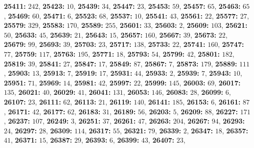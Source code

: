 \textsf{\bfseries 25411:} $242$, \textsf{\bfseries 25423:} $10$, \textsf{\bfseries 25439:} $34$, \textsf{\bfseries 25447:} $23$, \textsf{\bfseries 25453:} $59$, \textsf{\bfseries 25457:} $65$, \textsf{\bfseries 25463:} $65$, \textsf{\bfseries 25469:} $60$, \textsf{\bfseries 25471:} $6$, \textsf{\bfseries 25523:} $68$, \textsf{\bfseries 25537:} $10$, \textsf{\bfseries 25541:} $43$, \textsf{\bfseries 25561:} $22$, \textsf{\bfseries 25577:} $27$, \textsf{\bfseries 25579:} $329$, \textsf{\bfseries 25583:} $170$, \textsf{\bfseries 25589:} $255$, \textsf{\bfseries 25601:} $33$, \textsf{\bfseries 25603:} $2$, \textsf{\bfseries 25609:} $103$, \textsf{\bfseries 25621:} $50$, \textsf{\bfseries 25633:} $45$, \textsf{\bfseries 25639:} $21$, \textsf{\bfseries 25643:} $15$, \textsf{\bfseries 25657:} $160$, \textsf{\bfseries 25667:} $39$, \textsf{\bfseries 25673:} $22$, \textsf{\bfseries 25679:} $99$, \textsf{\bfseries 25693:} $39$, \textsf{\bfseries 25703:} $23$, \textsf{\bfseries 25717:} $138$, \textsf{\bfseries 25733:} $22$, \textsf{\bfseries 25741:} $160$, \textsf{\bfseries 25747:} $77$, \textsf{\bfseries 25759:} $117$, \textsf{\bfseries 25763:} $195$, \textsf{\bfseries 25771:} $18$, \textsf{\bfseries 25793:} $54$, \textsf{\bfseries 25799:} $42$, \textsf{\bfseries 25801:} $182$, \textsf{\bfseries 25819:} $39$, \textsf{\bfseries 25841:} $27$, \textsf{\bfseries 25847:} $17$, \textsf{\bfseries 25849:} $87$, \textsf{\bfseries 25867:} $7$, \textsf{\bfseries 25873:} $179$, \textsf{\bfseries 25889:} $111$, \textsf{\bfseries 25903:} $13$, \textsf{\bfseries 25913:} $7$, \textsf{\bfseries 25919:} $17$, \textsf{\bfseries 25931:} $44$, \textsf{\bfseries 25933:} $2$, \textsf{\bfseries 25939:} $7$, \textsf{\bfseries 25943:} $10$, \textsf{\bfseries 25951:} $71$, \textsf{\bfseries 25969:} $14$, \textsf{\bfseries 25981:} $42$, \textsf{\bfseries 25997:} $22$, \textsf{\bfseries 25999:} $145$, \textsf{\bfseries 26003:} $69$, \textsf{\bfseries 26017:} $135$, \textsf{\bfseries 26021:} $40$, \textsf{\bfseries 26029:} $41$, \textsf{\bfseries 26041:} $131$, \textsf{\bfseries 26053:} $146$, \textsf{\bfseries 26083:} $28$, \textsf{\bfseries 26099:} $6$, \textsf{\bfseries 26107:} $23$, \textsf{\bfseries 26111:} $62$, \textsf{\bfseries 26113:} $21$, \textsf{\bfseries 26119:} $140$, \textsf{\bfseries 26141:} $185$, \textsf{\bfseries 26153:} $6$, \textsf{\bfseries 26161:} $87$, \textsf{\bfseries 26171:} $42$, \textsf{\bfseries 26177:} $62$, \textsf{\bfseries 26183:} $31$, \textsf{\bfseries 26189:} $56$, \textsf{\bfseries 26203:} $5$, \textsf{\bfseries 26209:} $88$, \textsf{\bfseries 26227:} $171$, \textsf{\bfseries 26237:} $107$, \textsf{\bfseries 26249:} $3$, \textsf{\bfseries 26251:} $37$, \textsf{\bfseries 26261:} $47$, \textsf{\bfseries 26263:} $204$, \textsf{\bfseries 26267:} $94$, \textsf{\bfseries 26293:} $24$, \textsf{\bfseries 26297:} $28$, \textsf{\bfseries 26309:} $114$, \textsf{\bfseries 26317:} $55$, \textsf{\bfseries 26321:} $79$, \textsf{\bfseries 26339:} $2$, \textsf{\bfseries 26347:} $18$, \textsf{\bfseries 26357:} $41$, \textsf{\bfseries 26371:} $15$, \textsf{\bfseries 26387:} $29$, \textsf{\bfseries 26393:} $6$, \textsf{\bfseries 26399:} $43$, \textsf{\bfseries 26407:} $23$, 
